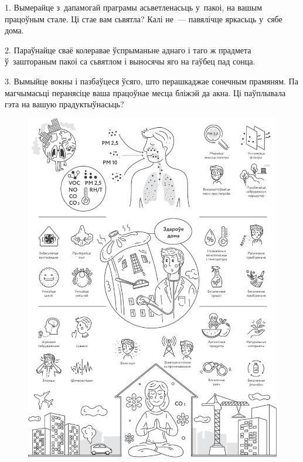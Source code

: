 1. Вымерайце з~дапамогай праграмы асьветленасьць у~пакоі, на вашым працоўным стале. Ці стае вам сьвятла? Калі не~--- павялічце яркасьць у~сябе дома.

2. Параўнайце сваё колеравае ўспрыманьне аднаго і таго ж прадмета ў~заштораным пакоі са сьвятлом і выносячы яго на гаўбец пад сонца.

3. Вымыйце вокны і пазбаўцеся ўсяго, што перашкаджае сонечным прамяням. Па магчымасьці перанясіце ваша працоўнае месца бліжэй да акна. Ці паўплывала гэта на вашую прадуктыўнасьць?

\clearpage
\thispagestyle{empty}
\begin{figure}[htb!]
  \vspace*{-0.25in}
  \includegraphics[width=\textwidth]{willpower/ch11/full.pdf}  
\end{figure}

